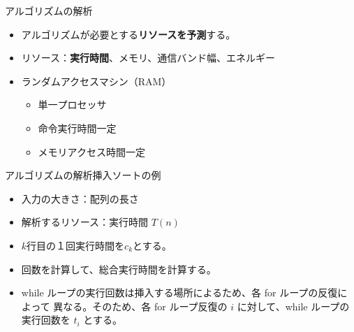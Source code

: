 \documentclass[unicode,11pt,aspectratio=169,hide notes]{beamer} %
\begin{document}

\begin{frame}{アルゴリズムの解析}
  \begin{itemize}
    \item アルゴリズムが必要とする\textbf{リソースを予測}する。
    \item リソース：\textbf{実行時間}、メモリ、通信バンド幅、エネルギー
    \item ランダムアクセスマシン（RAM）
    \begin{itemize}
      \item 単一プロセッサ
      \item 命令実行時間一定
      \item メモリアクセス時間一定
    \end{itemize}
  \end{itemize}
\end{frame}

\begin{frame}{アルゴリズムの解析}{挿入ソートの例}
  \begin{itemize}
    \item 入力の大きさ：配列の長さ
    \item 解析するリソース：実行時間 $T(n)$
    \item $k$行目の１回実行時間を$c_k$とする。
    \item 回数を計算して、総合実行時間を計算する。
    \item while ループの実行回数は挿入する場所によるため、各 for ループの反復によって
    異なる。そのため、各 for ループ反復の $i$ に対して、while ループの実行回数を $t_i$
    とする。
  \end{itemize}
\end{frame}

\end{document}
